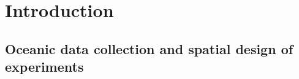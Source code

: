 \documentclass[aoas]{imsart}
\begin{document}
\section{Introduction}


\subsection{Oceanic data collection and spatial design of experiments}

\end{document}
